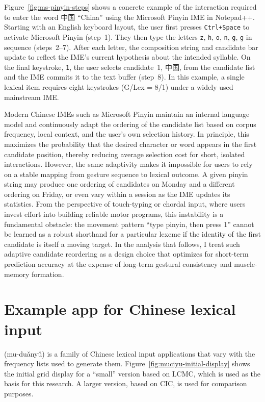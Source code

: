 Figure~\ref{fig:ms-pinyin-steps} shows a concrete example of the interaction required to enter the word 中国 ``China'' using the Microsoft Pinyin IME in Notepad++. Starting with an English keyboard layout, the user first presses \texttt{Ctrl+Space} to activate Microsoft Pinyin (step~1). They then type the letters \texttt{z}, \texttt{h}, \texttt{o}, \texttt{n}, \texttt{g}, \texttt{g} in sequence (steps~2--7). After each letter, the composition string and candidate bar update to reflect the IME's current hypothesis about the intended syllable. On the final keystroke, \texttt{1}, the user selects candidate~1, 中国, from the candidate list and the IME commits it to the text buffer (step~8). In this example, a single lexical item requires eight keystrokes (G/Lex = 8/1) under a widely used mainstream IME.

Modern Chinese IMEs such as Microsoft Pinyin maintain an internal language model and continuously adapt the ordering of the candidate list based on corpus frequency, local context, and the user's own selection history. In principle, this maximizes the probability that the desired character or word appears in the first candidate position, thereby reducing average selection cost for short, isolated interactions. However, the same adaptivity makes it impossible for users to rely on a stable mapping from gesture sequence to lexical outcome. A given pinyin string may produce one ordering of candidates on Monday and a different ordering on Friday, or even vary within a session as the IME updates its statistics. From the perspective of touch-typing or chordal input, where users invest effort into building reliable motor programs, this instability is a fundamental obstacle: the movement pattern ``type pinyin, then press 1'' cannot be learned as a robust shorthand for a particular lexeme if the identity of the first candidate is itself a moving target. In the analysis that follows, I treat such adaptive candidate reordering as a design choice that optimizes for short-term prediction accuracy at the expense of long-term gestural consistency and muscle-memory formation.


\section{Example \mulex app for Chinese lexical input}\label{sec:example-mulex-app-chinese}

\muciyu{} (mu-duǎnyǔ) is a family of \mulex Chinese lexical input applications that vary with the frequency lists used to generate them. Figure~\ref{fig:muciyu-initial-display} shows the initial grid display for a ``small'' version based on LCMC, which is used as the basis for this research. A larger version, based on CIC, is used for comparison purposes.

